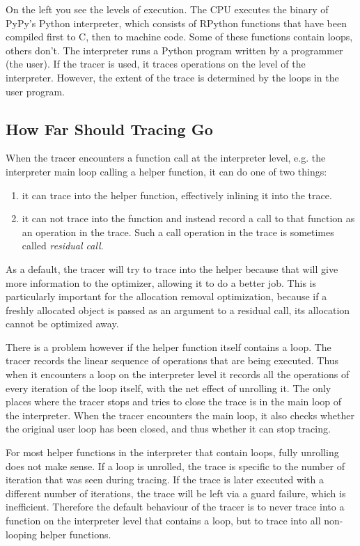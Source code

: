 \documentclass{sig-alternate}
\begin{document}
On the left you see the levels of execution. The CPU executes the binary of
PyPy's Python interpreter, which consists of RPython functions that have been
compiled first to C, then to machine code. Some of these functions contain
loops, others don't. The interpreter runs a Python program written by a
programmer (the user). If the tracer is used, it traces operations on the level
of the interpreter. However, the extent of the trace is determined by the loops
in the user program.


\subsection{How Far Should Tracing Go}

When the tracer encounters a function call at the interpreter level, e.g. the
interpreter main loop calling a helper function, it can do one of two things:

\begin{enumerate}
\item it can trace into the helper function, effectively inlining it into the trace.

\item it can not trace into the function and instead record a call to that function
as an operation in the trace. Such a call operation in the trace is sometimes
called \emph{residual call}.
\end{enumerate}

As a default, the tracer will try to trace into the helper because that will
give more information to the optimizer, allowing it to do a better job. This is
particularly important for the allocation removal optimization, because if a
freshly allocated object is passed as an argument to a residual call, its
allocation cannot be optimized away.

There is a problem however if the helper function itself contains a loop. The
tracer records the linear sequence of operations that are being executed. Thus
when it encounters a loop on the interpreter level it records all the
operations of every iteration of the loop itself, with the net effect of
unrolling it. The only places where the tracer stops and tries to close the
trace is in the main loop of the interpreter. When the tracer encounters the
main loop, it also checks whether the original user loop has been closed, and
thus whether it can stop tracing.

For most helper functions in the interpreter that contain loops, fully
unrolling does not make sense. If a loop is unrolled, the trace is specific to
the number of iteration that was seen during tracing. If the trace is later
executed with a different number of iterations, the trace will be left via a
guard failure, which is inefficient. Therefore the default behaviour of the
tracer is to never trace into a function on the interpreter level that contains
a loop, but to trace into all non-looping helper functions.
\end{document}
